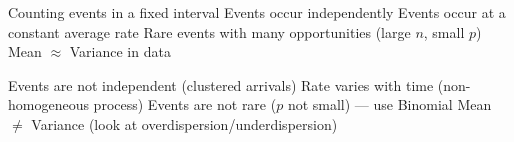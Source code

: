 
\PSyes{} Counting events in a fixed interval\PSbr{}\PSyes{} Events occur independently\PSbr{}\PSyes{} Events occur at a constant average rate\PSbr{}\PSyes{} Rare events with many opportunities (large $n$, small $p$)\PSbr{}\PSyes{} Mean \ensuremath{\approx} Variance in data


\PSno{} Events are not independent (clustered arrivals)\PSbr{}\PSno{} Rate varies with time (non-homogeneous process)\PSbr{}\PSno{} Events are not rare ($p$ not small) — use Binomial\PSbr{}\PSno{} Mean \ensuremath{\neq} Variance (look at overdispersion/underdispersion)



